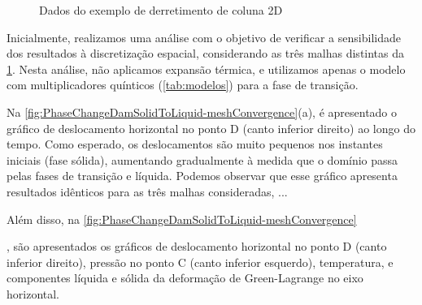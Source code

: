 \documentclass[Tese.tex]{subfiles}
\begin{document}
\begin{figure}[!htb]
	\centering
	\caption{Dados do exemplo de derretimento de coluna 2D}
	\label{fig:PhaseChangeDam}
	{\small
		\noindent{}
	}	
\end{figure}



Inicialmente, realizamos uma análise com o objetivo de verificar a sensibilidade dos resultados à discretização espacial, considerando as três malhas distintas da \cref{fig:PhaseChangeDam}. Nesta análise, não aplicamos expansão térmica, e utilizamos apenas o modelo com multiplicadores quínticos (\cref{tab:modelos}) para a fase de transição.

Na \cref{fig:PhaseChangeDamSolidToLiquid-meshConvergence}(a), é apresentado o gráfico de deslocamento horizontal no ponto D (canto inferior direito) ao longo do tempo. Como esperado, os deslocamentos são muito pequenos nos instantes iniciais (fase sólida), aumentando gradualmente à medida que o domínio passa pelas fases de transição e líquida. Podemos observar que esse gráfico apresenta resultados idênticos para as três malhas consideradas, ...

Além disso, na \cref{fig:PhaseChangeDamSolidToLiquid-meshConvergence}

, são apresentados os gráficos de deslocamento horizontal no ponto D (canto inferior direito), pressão no ponto C (canto inferior esquerdo), temperatura, e componentes líquida e sólida da deformação de Green-Lagrange no eixo horizontal.
\end{document}
